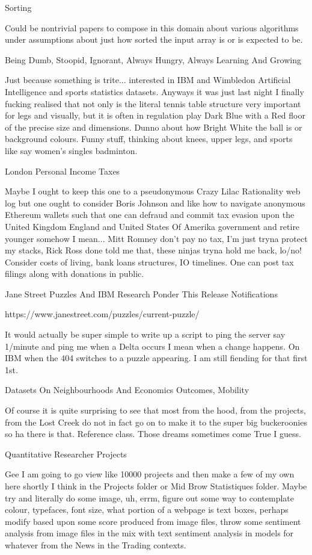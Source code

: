 	Sorting

Could be nontrivial papers to compose in this domain about various algorithms under assumptions about just how sorted the input array is or is expected to be.

	Being Dumb, Stoopid, Ignorant, Always Hungry, Always Learning And Growing

Just because something is trite... interested in IBM and Wimbledon Artificial Intelligence and sports statistics datasets. Anyways it was just last night I finally fucking realised that not only is the literal tennis table structure very important for legs and visually, but it is often in regulation play Dark Blue with a Red floor of the precise size and dimensions. Dunno about how Bright White the ball is or background colours. Funny stuff, thinking about knees, upper legs, and sports like say women's singles badminton.

	London Personal Income Taxes

Maybe I ought to keep this one to a pseudonymous Crazy Lilac Rationality web log but one ought to consider Boris Johnson and like how to navigate anonymous Ethereum wallets such that one can defraud and commit tax evasion upon the United Kingdom England and United States Of Amerika government and retire younger somehow I mean... Mitt Romney don't pay no tax, I'm just tryna protect my stacks, Rick Ross done told me that, these ninjas tryna hold me back, lo/no! Consider costs of living, bank loans structures, IO timelines. One can post tax filings along with donations in public.

	Jane Street Puzzles And IBM Research Ponder This Release Notifications

	https://www.janestreet.com/puzzles/current-puzzle/

It would actually be super simple to write up a script to ping the server say 1/minute and ping me when a Delta occurs I mean when a change happens. On IBM when the 404 switches to a puzzle appearing. I am still fiending for that first 1st.

	Datasets On Neighbourhoods And Economics Outcomes, Mobility

Of course it is quite surprising to see that most from the hood, from the projects, from the Lost Creek do not in fact go on to make it to the super big buckeroonies so ha there is that. Reference class. Those dreams sometimes come True I guess.

	Quantitative Researcher Projects

Gee I am going to go view like 10000 projects and then make a few of my own here shortly I think in the Projects folder or Mid Brow Statistiques folder. Maybe try and literally do some image, uh, errm, figure out some way to contemplate colour, typefaces, font size, what portion of a webpage is text boxes, perhaps modify based upon some score produced from image files, throw some sentiment analysis from image files in the mix with text sentiment analysis in models for whatever from the News in the Trading contexts.

